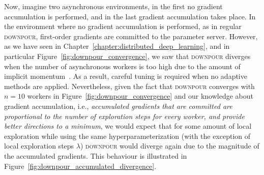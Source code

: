 Now, imagine two asynchronous environments, in the first no gradient accumulation is performed, and in the last gradient accumulation takes place. In the environment where no gradient accumulation is performed, as in regular \textsc{downpour}, first-order gradients are committed to the parameter server. However, as we have seen in Chapter~\ref{chapter:distributed_deep_learning}, and in particular Figure~\ref{fig:downpour_convergence}, we saw that \textsc{downpour} diverges when the number of asynchronous workers is too high due to the amount of implicit momentum~\cite{implicitmomentum}. As a result, careful tuning is required when no adaptive methods are applied. Nevertheless, given the fact that \textsc{downpour} converges with $n = 10$ workers in Figure~\ref{fig:downpour_convergence} and our knowledge about gradient accumulation, i.e., \emph{accumulated gradients that are committed are proportional to the number of exploration steps for every worker, and provide better directions to a minimum}, we would expect that for some amount of local exploration while using the same hyperparameterization (with the exception of local exploration steps $\lambda$) \textsc{downpour} would diverge again due to the magnitude of the accumulated gradients. This behaviour is illustrated in Figure~\ref{fig:downpour_accumulated_divergence}.\\


